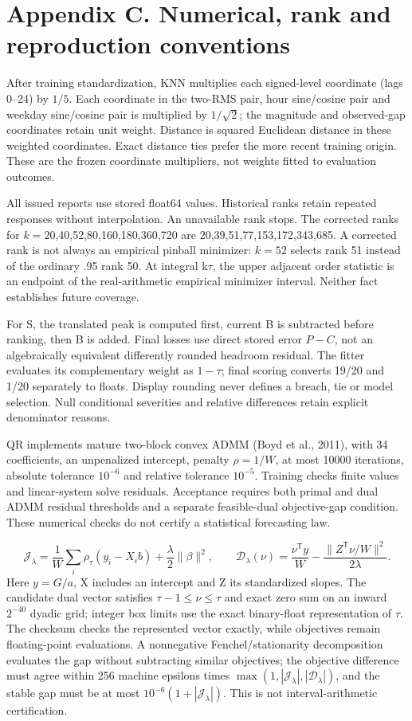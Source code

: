 \documentclass[10pt,a4paper]{article}
\begin{document}
\section*{Appendix C. Numerical, rank and reproduction conventions}
After training standardization, KNN multiplies each signed-level coordinate (lags 0--24) by \(1/5\). Each coordinate in the two-RMS pair, hour sine/cosine pair and weekday sine/cosine pair is multiplied by \(1/\sqrt2\); the magnitude and observed-gap coordinates retain unit weight. Distance is squared Euclidean distance in these weighted coordinates. Exact distance ties prefer the more recent training origin. These are the frozen coordinate multipliers, not weights fitted to evaluation outcomes.

All issued reports use stored float64 values. Historical ranks retain repeated responses without interpolation. An unavailable rank stops. The corrected ranks for \(k=20\),40,52,80,160,180,360,720 are 20,39,51,77,153,172,343,685. A corrected rank is not always an empirical pinball minimizer: \(k=52\) selects rank 51 instead of the ordinary .95 rank 50. At integral k\(\tau\), the upper adjacent order statistic is an endpoint of the real-arithmetic empirical minimizer interval. Neither fact establishes future coverage.

For S, the translated peak is computed first, current B is subtracted before ranking, then B is added. Final losses use direct stored error \(P-C\), not an algebraically equivalent differently rounded headroom residual. The fitter evaluates its complementary weight as \(1-\tau\); final scoring converts 19/20 and 1/20 separately to floats. Display rounding never defines a breach, tie or model selection. Null conditional severities and relative differences retain explicit denominator reasons.

QR implements mature two-block convex ADMM (Boyd et al., 2011), with 34 coefficients, an unpenalized intercept, penalty \(\rho=1/W\), at most 10000 iterations, absolute tolerance \(10^{-6}\) and relative tolerance \(10^{-5}\). Training checks finite values and linear-system solve residuals. Acceptance requires both primal and dual ADMM residual thresholds and a separate feasible-dual objective-gap condition. These numerical checks do not certify a statistical forecasting law.

\[
\mathcal J_\lambda=\frac1W\sum_i\rho_\tau(y_i-X_i b)+\frac\lambda2\|\beta\|^2,\qquad\mathcal D_\lambda(\nu)=\frac{\nu^{\mathsf T}y}{W}-\frac{\|Z^{\mathsf T}\nu/W\|^2}{2\lambda}.
\]
Here \(y=G/a\), X includes an intercept and Z its standardized slopes. The candidate dual vector satisfies \(\tau-1\le\nu\le\tau\) and exact zero sum on an inward \(2^{-40}\) dyadic grid; integer box limits use the exact binary-float representation of \(\tau\). The checksum checks the represented vector exactly, while objectives remain floating-point evaluations. A nonnegative Fenchel/stationarity decomposition evaluates the gap without subtracting similar objectives; the objective difference must agree within 256 machine epsilons times \(\max(1,|\mathcal J_\lambda|,|\mathcal D_\lambda|)\), and the stable gap must be at most \(10^{-6}(1+|\mathcal J_\lambda|)\). This is not interval-arithmetic certification.
\end{document}
